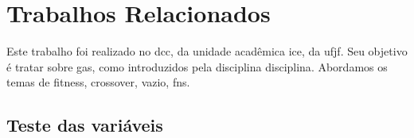 \chapter{Trabalhos Relacionados}%
\label{cap:relacionados}


Este trabalho foi realizado no \gls{dcc}, da unidade acadêmica \gls{ice}, da \gls{ufjf}.
Seu objetivo é tratar sobre \glspl{ga}, como introduzidos pela disciplina \gls{disciplina}.
Abordamos os temas de \gls{fitness}, \gls{crossover}, \gls{vazio}, \glspl{fn}.

\section{Teste das variáveis}%
\label{sec:teste_variaveis}

\testaVariaveis{}

\lipsum[1-20] %

